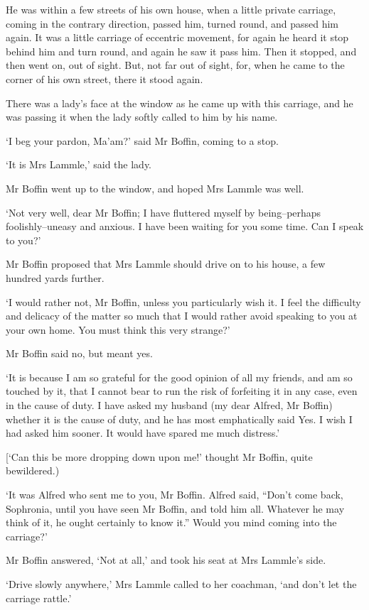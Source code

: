 He was within a few streets of his own house, when a little private
carriage, coming in the contrary direction, passed him, turned round,
and passed him again. It was a little carriage of eccentric movement,
for again he heard it stop behind him and turn round, and again he saw
it pass him. Then it stopped, and then went on, out of sight. But, not
far out of sight, for, when he came to the corner of his own street,
there it stood again.

There was a lady’s face at the window as he came up with this carriage,
and he was passing it when the lady softly called to him by his name.

‘I beg your pardon, Ma’am?’ said Mr Boffin, coming to a stop.

‘It is Mrs Lammle,’ said the lady.

Mr Boffin went up to the window, and hoped Mrs Lammle was well.

‘Not very well, dear Mr Boffin; I have fluttered myself by
being--perhaps foolishly--uneasy and anxious. I have been waiting for
you some time. Can I speak to you?’

Mr Boffin proposed that Mrs Lammle should drive on to his house, a few
hundred yards further.

‘I would rather not, Mr Boffin, unless you particularly wish it. I feel
the difficulty and delicacy of the matter so much that I would rather
avoid speaking to you at your own home. You must think this very
strange?’

Mr Boffin said no, but meant yes.

‘It is because I am so grateful for the good opinion of all my
friends, and am so touched by it, that I cannot bear to run the risk of
forfeiting it in any case, even in the cause of duty. I have asked my
husband (my dear Alfred, Mr Boffin) whether it is the cause of duty,
and he has most emphatically said Yes. I wish I had asked him sooner. It
would have spared me much distress.’

[‘Can this be more dropping down upon me!’ thought Mr Boffin, quite
bewildered.)

‘It was Alfred who sent me to you, Mr Boffin. Alfred said, “Don’t
come back, Sophronia, until you have seen Mr Boffin, and told him all.
Whatever he may think of it, he ought certainly to know it.” Would you
mind coming into the carriage?’

Mr Boffin answered, ‘Not at all,’ and took his seat at Mrs Lammle’s
side.

‘Drive slowly anywhere,’ Mrs Lammle called to her coachman, ‘and don’t
let the carriage rattle.’

